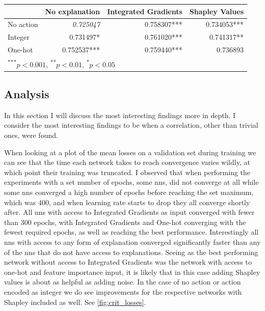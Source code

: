 \documentclass[UKenglish]{uiomasterthesis}
\begin{document}
\begin{center}
\label{tab:event_simpl_trunc}
\begin{tabular}{lrrr}
\toprule
 & No explanation & Integrated Gradients & Shapley Values \\
 \midrule
No action & \textit{0.725047} & 0.758307*** & 0.734053*** \\
Integer & 0.731497* & 0.761020*** & 0.741317** \\
One-hot & 0.752537*** & 0.759440*** & 0.736893 \\
\bottomrule
\multicolumn{3}{l}{\textsuperscript{***}$p<0.001$, 
  \textsuperscript{**}$p<0.01$, 
  \textsuperscript{*}$p<0.05$}
\end{tabular}
\end{center}

\subsection{Analysis}
In this section I will discuss the most interesting findings more in depth. I consider the most interesting findings to be when a correlation, other than trivial ones, were found.


When looking at a plot of the mean losses on a validation set during training we can see that the time each network takes to reach convergence varies wildly, at which point their training was truncated. I observed that when performing the experiments with a set number of epochs, some \acp{nn}, did not converge at all while some \acp{nn} converged a high number of epochs before reaching the set maximum, which was 400, and when learning rate starts to drop they all converge shortly after. All \acp{nn} with access to Integrated Gradients as input converged with fewer than 300 epochs, with Integrated Gradients and One-hot converging with the fewest required epochs, as well as reaching the best performance. Interestingly all \acp{nn} with access to any form of explanation converged significantly faster than any of the \acp{nn} that do not have access to explanations. Seeing as the best performing network without access to Integrated Gradients was the network with access to one-hot and feature importance input, it is likely that in this case adding Shapley values is about as helpful as adding noise. In the case of no action or action encoded as integer we do see improvements for the respective networks with Shapley included as well. See \cref{fig:crit_losses}.
\end{document}
